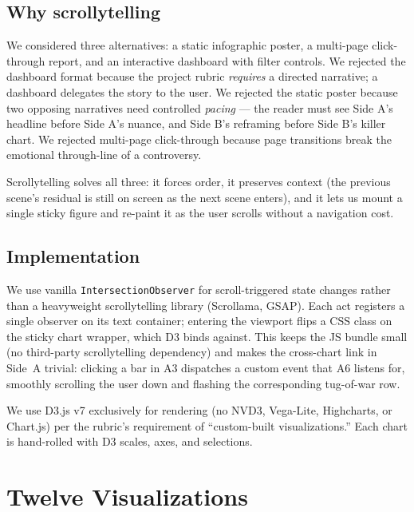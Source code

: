 \documentclass[sigconf,nonacm,natbib=false]{acmart}
\begin{document}
\subsection{Why scrollytelling}

We considered three alternatives: a static infographic poster, a
multi-page click-through report, and an interactive dashboard with
filter controls. We rejected the dashboard format because the
project rubric \emph{requires} a directed narrative; a dashboard
delegates the story to the user. We rejected the static poster
because two opposing narratives need controlled \emph{pacing} ---
the reader must see Side A's headline before Side A's nuance, and
Side B's reframing before Side B's killer chart. We rejected
multi-page click-through because page transitions break the
emotional through-line of a controversy.

Scrollytelling solves all three: it forces order, it preserves
context (the previous scene's residual is still on screen as the
next scene enters), and it lets us mount a single sticky figure and
re-paint it as the user scrolls without a navigation cost.

\subsection{Implementation}

We use vanilla \texttt{IntersectionObserver} for scroll-triggered
state changes rather than a heavyweight scrollytelling library
(Scrollama, GSAP). Each act registers a single observer on its
text container; entering the viewport flips a CSS class on the
sticky chart wrapper, which D3 binds against. This keeps the JS
bundle small (no third-party scrollytelling dependency) and makes
the cross-chart link in Side~A trivial: clicking a bar in A3
dispatches a custom event that A6 listens for, smoothly scrolling
the user down and flashing the corresponding tug-of-war row.

We use D3.js v7 exclusively for rendering (no NVD3, Vega-Lite,
Highcharts, or Chart.js) per the rubric's requirement of
``custom-built visualizations.'' Each chart is hand-rolled with
D3 scales, axes, and selections.

\section{Twelve Visualizations}
\end{document}
